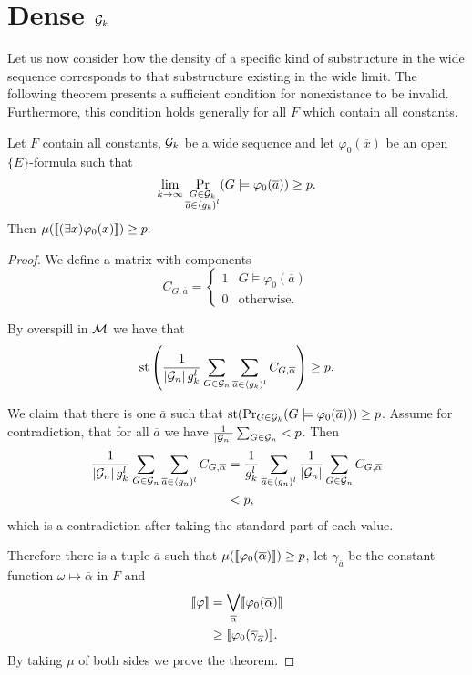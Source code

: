 \section{Dense \texorpdfstring{$\mathcal{G}_k$}{Gk}}

Let us now consider how the density of a specific kind of substructure in the wide sequence corresponds to that substructure existing in the wide limit. The following theorem presents a sufficient condition for nonexistance to be invalid. Furthermore, this condition holds generally for all $F$ which contain all constants.

\begin{thrm}\label{thrmexists}
Let $F$ contain all constants, $\mathcal{G}_k$ be a wide sequence and let $\varphi_0(\overline x)$ be an open $\{E\}$-formula such that
\[\lim_{k\to\infty}\Pr_{\substack{G\in\mathcal{G}_k\\\overline a \in \langle g_k)^l}}(G\models\varphi_0(\overline a))\geq p.\]
Then $\mu([\![(\exists x)\varphi_0(x)]\!])\geq p.$
\end{thrm}

\begin{proof}
We define a matrix with components 
\[C_{G,\overline a}=\begin{cases}1&G\models\varphi_0(\overline a)\\0&\text{otherwise}.\end{cases}\]

By overspill in $\mathcal{M}$ we have that
\[\text{st}\left (\frac{1}{\left|{\mathcal{G}_n}\right|g_k^l}\sum_{G\in\mathcal{G}_n}\sum_{\overline a \in \langle g_k)^l}C_{G,\overline \alpha}\right )\geq p.\]

We claim that there is one $\overline a$ such that $\text{st}(\Pr_{G\in\mathcal{G}_k}(G\models\varphi_0(\overline a)))\geq p$. Assume for contradiction, that for all $\overline a$ we have $\frac{1}{\left|{\mathcal{G}_n}\right|}\sum_{G\in \mathcal{G}_n}<p$. Then
\begin{align}
\frac{1}{\left|{\mathcal{G}_n}\right|g_k^l}\sum_{G\in\mathcal{G}_n}\sum_{\overline a \in \langle g_n)^l}C_{G,\overline \alpha}&=
\frac{1}{g_k^l}\sum_{\overline a\in\langle g_n)^l}\frac{1}{\left|{\mathcal{G}_n}\right|}\sum_{G\in\mathcal{G}_n}C_{G,\overline \alpha}\\
&< p,
\end{align}
which is a contradiction after taking the standard part of each value.

Therefore there is a tuple $\overline a$ such that $\mu([\![\varphi_0(\overline\alpha)]\!])\geq p$, let $\gamma_{\overline a}$ be the constant function $\omega \mapsto \overline \alpha$ in $F$ and
\begin{align}
[\![\varphi]\!]&=\bigvee_{\overline\alpha}[\![\varphi_0(\overline\alpha)]\!]\\
&\geq [\![\varphi_0(\overline \gamma_{\overline a})]\!].
\end{align}
By taking $\mu$ of both sides we prove the theorem.
\end{proof}


